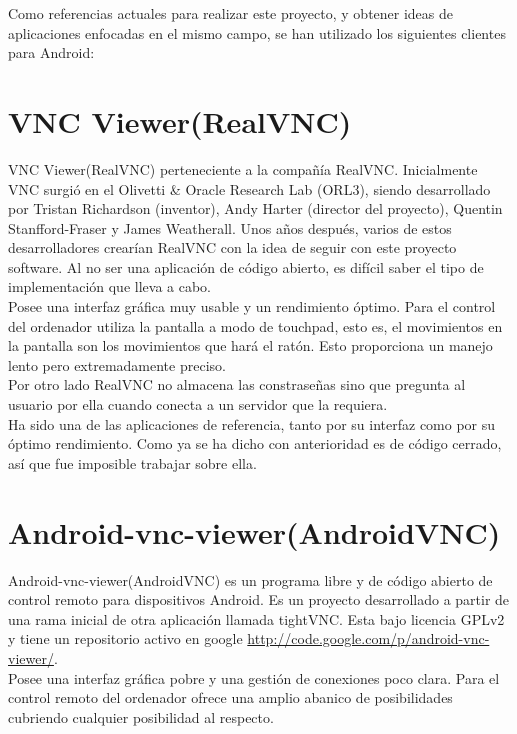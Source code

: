 Como referencias actuales para realizar este proyecto, y obtener ideas de aplicaciones enfocadas en el mismo campo, se han utilizado los siguientes clientes para Android:
\section{VNC Viewer(RealVNC)}
VNC Viewer(RealVNC)\cite{wiki:realvnc} perteneciente a la compañía RealVNC. Inicialmente VNC surgió en el Olivetti \& Oracle Research Lab (ORL3), siendo desarrollado por Tristan Richardson (inventor), Andy Harter (director del proyecto), Quentin Stanfford-Fraser y James Weatherall. Unos años después, varios de estos desarrolladores crearían RealVNC con la idea de seguir con este proyecto software. Al no ser una aplicación de código abierto, es difícil saber el tipo de implementación que lleva a cabo.\\

Posee una interfaz gráfica muy usable y un rendimiento óptimo. Para el control del ordenador utiliza la pantalla a modo de touchpad, esto es, el movimientos en la pantalla son los movimientos que hará el ratón. Esto proporciona un manejo lento pero extremadamente preciso.\\

Por otro lado RealVNC no almacena las constraseñas sino que pregunta al usuario por ella cuando conecta a un servidor que la requiera.\\

Ha sido una de las aplicaciones de referencia, tanto por su interfaz como por su óptimo rendimiento. Como ya se ha dicho con anterioridad es de código cerrado, así que fue imposible trabajar sobre ella.
\newpage
\section{Android-vnc-viewer(AndroidVNC)}
Android-vnc-viewer(AndroidVNC)\cite{androidvnc:androidvnc} es un programa libre y de código abierto de control remoto para dispositivos Android. Es un proyecto desarrollado a partir de una rama inicial de otra aplicación llamada tightVNC. Esta bajo licencia GPLv2 y tiene un repositorio activo en google \url{http://code.google.com/p/android-vnc-viewer/}.\\

Posee una interfaz gráfica pobre y una gestión de conexiones poco clara. Para el control remoto del ordenador ofrece una amplio abanico de posibilidades cubriendo cualquier posibilidad al respecto.\\


